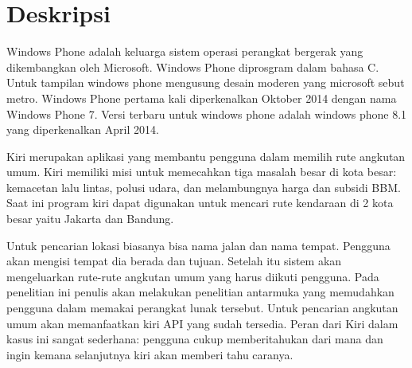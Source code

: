 \documentclass[a4paper,twoside]{article}
\begin{document}
\title{\@judultopik}
\author{\nama \textendash \@npm} 

\newcommand{\nama}{Yohan}
\newcommand{\@npm}{2011730048}
\newcommand{\@judultopik}{Pencari Rute Kendaraan Umum untuk Windows Phone} %
\newcommand{\jumpemb}{1} %
\newcommand{\tanggal}{08/06/2014}
\maketitle


\section{Deskripsi}
Windows Phone adalah keluarga sistem operasi perangkat bergerak yang dikembangkan oleh Microsoft. Windows Phone diprosgram dalam bahasa C. Untuk tampilan windows phone mengusung desain moderen yang microsoft sebut metro. Windows Phone pertama kali diperkenalkan Oktober 2014 dengan nama Windows Phone 7. Versi terbaru untuk windows phone adalah windows phone 8.1 yang diperkenalkan April 2014.

Kiri merupakan aplikasi yang membantu pengguna dalam memilih rute angkutan umum. Kiri memiliki misi untuk memecahkan tiga masalah besar di kota besar: kemacetan lalu lintas, polusi udara, dan melambungnya harga dan subsidi BBM. Saat ini program kiri dapat digunakan untuk mencari rute kendaraan di 2 kota besar yaitu Jakarta dan Bandung.

Untuk pencarian lokasi biasanya bisa nama jalan dan nama tempat. Pengguna akan mengisi tempat dia berada dan tujuan. Setelah itu sistem akan mengeluarkan rute-rute angkutan umum yang harus diikuti pengguna. Pada penelitian ini penulis akan melakukan penelitian antarmuka yang memudahkan pengguna dalam memakai perangkat lunak tersebut. Untuk pencarian angkutan umum akan memanfaatkan kiri API yang sudah tersedia. Peran dari Kiri dalam kasus ini sangat sederhana: pengguna cukup memberitahukan dari mana dan ingin kemana selanjutnya kiri akan memberi tahu caranya. 
\end{document}
